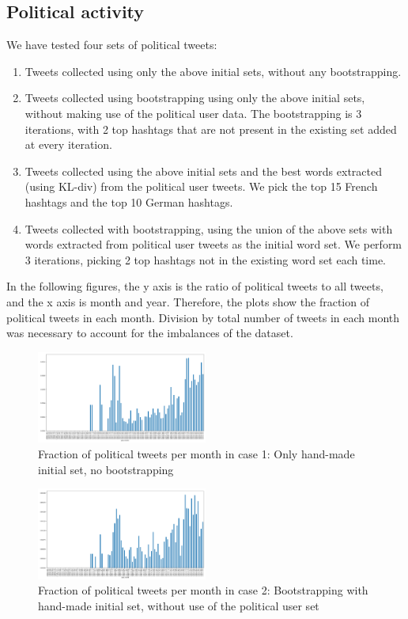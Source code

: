 \subsection{Political activity}

We have tested four sets of political tweets:
\begin{enumerate}
 \item Tweets collected using only the above initial sets, without any bootstrapping.
\item Tweets collected using bootstrapping using only the above initial sets, without making use of the political user data. The bootstrapping is 3 iterations, with 2 top hashtags that are not present in the existing set added at every iteration.
\item Tweets collected using the above initial sets and the best words extracted (using KL-div) from the political user tweets. We pick the top 15 French hashtags and the top 10 German hashtags.
\item Tweets collected with bootstrapping, using the union of the above sets with words extracted from political user tweets as the initial word set. We perform 3 iterations, picking 2 top hashtags not in the existing word set each time.
\end{enumerate}

In the following figures, the y axis is the ratio of political tweets to all tweets, and the x axis is month and year. Therefore, the plots show the fraction of political tweets in each month. Division by total number of tweets in each month was necessary to account for the imbalances of the dataset.

\begin{figure}[h]
  \includegraphics[width=0.5\textwidth]{images/case1_pol.PNG}
  \caption{Fraction of political tweets per month in case 1: Only hand-made initial set, no bootstrapping}
  \label{case_1_hist}
\end{figure}

\begin{figure}[h]
  \includegraphics[width=0.5\textwidth]{images/case2_pol.PNG}
  \caption{Fraction of political tweets per month in case 2: Bootstrapping with hand-made initial set, without use of the political user set}
  \label{case_2_hist}
\end{figure}

